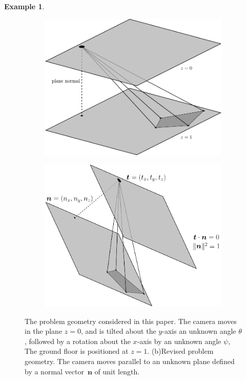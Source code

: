 \documentclass[11pt,a4paper]{article}
\theoremstyle{definition}
\newtheorem{example}{Example}
\newcommand{\mat}[1]{\bm{#1}}
\begin{document}
\begin{example}
\begin{figure}[t!]
\centering
\begin{subfigure}[b]{0.475\textwidth}
    \centering
    \includegraphics[width=\textwidth]{prob_geom1}
    \caption{}
    \label{fig:prob_geom:a}
\end{subfigure}
\hfill
\begin{subfigure}[b]{0.475\textwidth}
    \centering
    \includegraphics[width=\textwidth]{prob_geom1b}
    \caption{}
    \label{fig:prob_geom:b}
\end{subfigure}
\caption{The problem geometry considered in this paper. The camera moves in the plane $z=0$,
and is tilted about the $y$-axis an unknown angle $\theta$, followed by a rotation about
the $x$-axis by an unknown angle $\psi$, The ground floor is positioned at $z=1$.
(b)Revised problem geometry. The camera moves parallel to an unknown plane
defined by a normal vector~$\mat{n}$ of unit length.}
\label{fig:prob_geom}
\end{figure}


\end{example}
\end{document}
